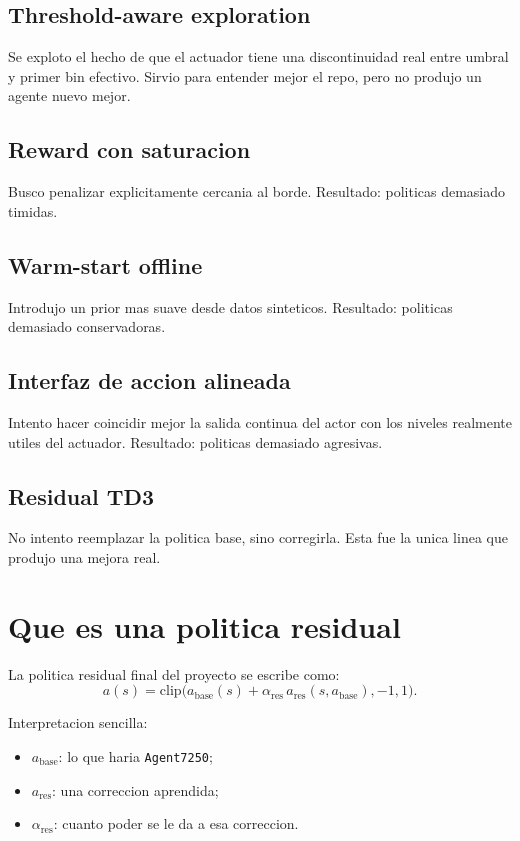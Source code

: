 \documentclass[11pt,a4paper]{article}
\begin{document}
\subsection{Threshold-aware exploration}
Se exploto el hecho de que el actuador tiene una discontinuidad real entre umbral y primer bin efectivo. Sirvio para entender mejor el repo, pero no produjo un agente nuevo mejor.

\subsection{Reward con saturacion}
Busco penalizar explicitamente cercania al borde. Resultado: politicas demasiado timidas.

\subsection{Warm-start offline}
Introdujo un prior mas suave desde datos sinteticos. Resultado: politicas demasiado conservadoras.

\subsection{Interfaz de accion alineada}
Intento hacer coincidir mejor la salida continua del actor con los niveles realmente utiles del actuador. Resultado: politicas demasiado agresivas.

\subsection{Residual TD3}
No intento reemplazar la politica base, sino corregirla. Esta fue la unica linea que produjo una mejora real.

\section{Que es una politica residual}

La politica residual final del proyecto se escribe como:
\[
a(s)=\mathrm{clip}\Big(a_{\mathrm{base}}(s)+\alpha_{\mathrm{res}}\,a_{\mathrm{res}}(s,a_{\mathrm{base}}),-1,1\Big).
\]

Interpretacion sencilla:
\begin{itemize}[leftmargin=1.5em]
\item \(a_{\mathrm{base}}\): lo que haria \texttt{Agent7250};
\item \(a_{\mathrm{res}}\): una correccion aprendida;
\item \(\alpha_{\mathrm{res}}\): cuanto poder se le da a esa correccion.
\end{itemize}
\end{document}
